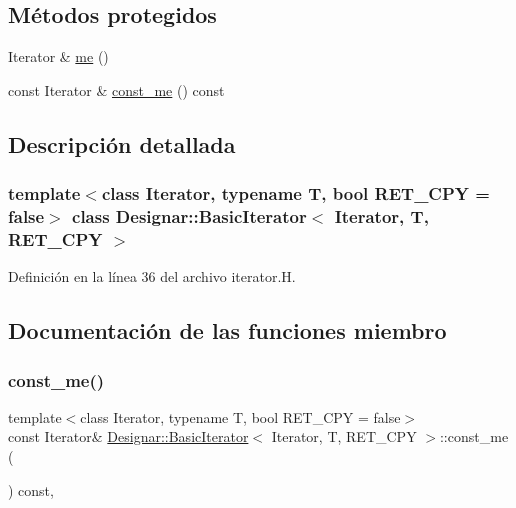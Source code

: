 \subsection*{Métodos protegidos}
\begin{DoxyCompactItemize}
\item 
Iterator \& \hyperlink{class_designar_1_1_basic_iterator_a5b550cbd8bb7ee464e8cdb6b023c437a}{me} ()
\item 
const Iterator \& \hyperlink{class_designar_1_1_basic_iterator_a7ccea1264814695d7c9466daa713cb17}{const\+\_\+me} () const
\end{DoxyCompactItemize}


\subsection{Descripción detallada}
\subsubsection*{template$<$class Iterator, typename T, bool R\+E\+T\+\_\+\+C\+PY = false$>$\newline
class Designar\+::\+Basic\+Iterator$<$ Iterator, T, R\+E\+T\+\_\+\+C\+P\+Y $>$}



Definición en la línea 36 del archivo iterator.\+H.



\subsection{Documentación de las funciones miembro}
\mbox{\label{class_designar_1_1_basic_iterator_a7ccea1264814695d7c9466daa713cb17}} 
\subsubsection{\texorpdfstring{const\+\_\+me()}{const\_me()}}
{\footnotesize\ttfamily template$<$class Iterator, typename T, bool R\+E\+T\+\_\+\+C\+PY = false$>$ \\
const Iterator\& \hyperlink{class_designar_1_1_basic_iterator}{Designar\+::\+Basic\+Iterator}$<$ Iterator, T, R\+E\+T\+\_\+\+C\+PY $>$\+::const\+\_\+me (\begin{DoxyParamCaption}{ }\end{DoxyParamCaption}) const\hspace{0.3cm}{\ttfamily [inline]}, {\ttfamily [protected]}}



